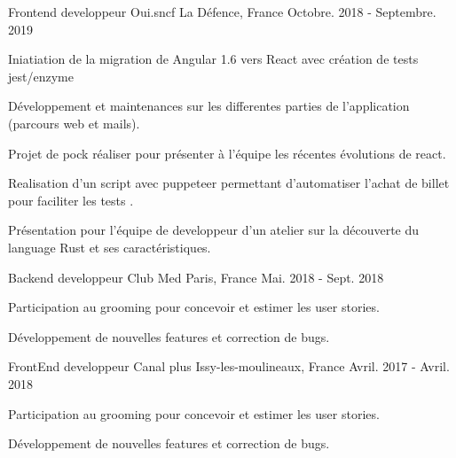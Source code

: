 

\begin{cventries}

  \cventry
    {Frontend developpeur} %
    {Oui.sncf} %
    {La Défence, France} %
    {Octobre. 2018 - Septembre. 2019} %
    {
      \begin{cvitems} %
        \item {Iniatiation de la migration de Angular 1.6 vers React avec création de tests jest/enzyme}
        \item {Développement et maintenances  sur les differentes parties de l'application (parcours web et mails).}
        \item {Projet de pock réaliser pour présenter à l'équipe les récentes évolutions de react.}
        \item {Realisation d'un script avec puppeteer permettant d'automatiser l'achat de billet pour faciliter les tests .}
        \item {Présentation pour l'équipe de developpeur d'un atelier sur la  découverte du language Rust et ses caractéristiques.}
      \end{cvitems}
    }
\cventry
  {Backend developpeur} %
  {Club Med} %
  {Paris, France} %
  {Mai. 2018 - Sept. 2018} %
  {
    \begin{cvitems} %
      \item {Participation au grooming pour concevoir et estimer les user stories.}
      \item {Développement de nouvelles features et correction de bugs.}
    \end{cvitems}
  }

  \cventry
    {FrontEnd developpeur} %
    {Canal plus} %
    {Issy-les-moulineaux, France} %
    {Avril. 2017 - Avril. 2018} %
    {
      \begin{cvitems} %
        \item {Participation au grooming pour concevoir et estimer les user stories.}
        \item {Développement de nouvelles features et correction de bugs.}
      \end{cvitems}
    }


\end{cventries}
